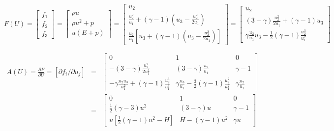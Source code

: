 \documentclass{article}
\begin{document}
\begin{equation}
  F(U) = \left[
    \begin{array}{c}
      f_1 \\
      f_2 \\
      f_3
    \end{array}
  \right] = \left[
    \begin{array}{c}
      \rho u\\
      \rho u^2 + p\\
      u(E+p)
    \end{array}
  \right] = \left[
    \begin{array}{c}
      u_2\\
      \frac{u_2^2}{u_1} + (\gamma-1) (u_3-\frac{u_2^2}{2u_1})\\
      \frac{u_2}{u_1} [ u_3 + (\gamma-1)(u_3-\frac{u_2^2}{2u_1}) ]
    \end{array}
  \right] = \left[
    \begin{array}{c}
      u_2\\
      (3-\gamma)\frac{u_2^2}{2u_1}+(\gamma-1)u_3\\
      \gamma \frac{u_2}{u_1} u_3 - \frac{1}{2}(\gamma-1)\frac{u_2^3}{u_1^2}
    \end{array}
  \right]
\end{equation}

\begin{eqnarray}
  A(U) = \frac{\partial F}{\partial U} = \left[ \partial f_i/\partial u_j \right] & = & \left[
    \begin{array}{ccc}
      0 & 1 & 0 \\
      -(3-\gamma)\frac{u_2^2}{2u_1^2} & (3-\gamma)\frac{u_2}{u_1} & \gamma-1\\
      -\gamma\frac{u_2 u_3}{u_1^2} + (\gamma-1)\frac{u_2^3}{u_1^3} & \gamma\frac{u_3}{u_1}-\frac{3}{2}(\gamma-1)\frac{u_2^2}{u_1^2} & \gamma\frac{u_2}{u_1}
    \end{array}
   \right] \\
  &=& \left[
    \begin{array}{ccc}
      0 & 1 & 0 \\
      \frac{1}{2}(\gamma-3) u^2 & (3-\gamma) u & \gamma-1\\
      u [\frac{1}{2}(\gamma-1)u^2-H] & H-(\gamma-1)u^2 & \gamma u
    \end{array}
  \right]
\end{eqnarray}
\end{document}
